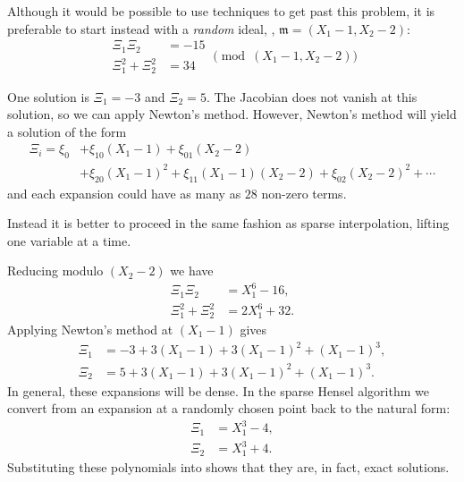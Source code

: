 Although it would be possible to use  techniques to
get past this problem, it is preferable to start instead with a {\em
random} ideal, \eg, $\mathfrak{m} = (X_1 - 1, X_2 - 2)$:
\[
\begin{aligned}
\Xi_1 \Xi_2 & = -15 \\
\Xi_1^2 + \Xi_2^2 & = 34
\end{aligned}
\pmod{(X_1 - 1, X_2 - 2)}
\]

One solution is $\Xi_1 = -3$ and $\Xi_2 = 5$.  The Jacobian does not vanish
at this solution, so we can apply Newton's method.  However, Newton's
method will yield a solution of the form
\[
\begin{aligned}
\Xi_i = \xi_0 &+ \xi_{10} (X_1 - 1) + \xi_{01} (X_2 - 2) \\
&+ \xi_{20} (X_1 - 1)^2 + \xi_{11} (X_1 -1)(X_2-2) + \xi_{02} (X_2 - 2)^2 
 + \cdots
\end{aligned}
\]
and each expansion could have as many as $28$ non-zero terms.  

Instead it is better to proceed in the same fashion as sparse
interpolation, lifting one variable at a time.  

Reducing  modulo $(X_2-2)$ we have
\begin{equation} \label{SPH:2var:Red:Eq}
\begin{aligned}
\Xi_1 \Xi_2 & = X_1^6 - 16, \\
\Xi_1^2 + \Xi_2^2 & = 2X_1^6 + 32.
\end{aligned}
\end{equation}
Applying Newton's method at $(X_1 - 1)$ gives
\[
\begin{aligned}
\Xi_1 & = -3 + 3 (X_1 -1) + 3(X_1-1)^2 + (X_1 -1)^3, \\
\Xi_2 & = 5 + 3 (X_1 -1) + 3(X_1-1)^2 + (X_1 -1)^3.
\end{aligned}
\]
In general, these expansions will be dense.  In the sparse Hensel
algorithm we convert from an expansion at a randomly chosen point back
to the natural form:
\begin{equation} \label{SPH:2var:RedSol:Eq}
\begin{aligned}
\Xi_1 & = X_1^3 - 4, \\
\Xi_2 & = X_1^3 + 4.
\end{aligned}
\end{equation}
Substituting these polynomials into  shows
that they are, in fact, exact solutions.

